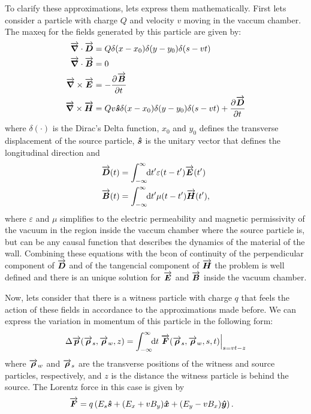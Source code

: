 \documentclass[
	12pt,				%
	openright,			%
	oneside,			%
	a4paper,		%
	chapter=TITLE,		%
	section=TITLE,		%
    brazil,				%
	english,			%
	sumario=tradicional,
	]{abntex2}
\begin{document}
  To clarify these approximations, lets express them mathematically. First lets consider a particle with charge $Q$ and velocity $v$  moving in the vaccum chamber. The \gls{maxeq} for the fields generated by this particle are given by:
  \begin{align}\label{eq:maxeq}
	  \nonumber
      \overrightarrow{\boldsymbol{\nabla}}\cdot\overrightarrow{\boldsymbol{D}} &= Q\delta(x-x_0)\delta(y-y_0)\delta(s-vt)\\ \nonumber
	  \overrightarrow{\boldsymbol{\nabla}}\cdot\overrightarrow{\boldsymbol{B}} &= 0\\
	  \overrightarrow{\boldsymbol{\nabla}}\times\overrightarrow{\boldsymbol{E}} &= -\frac{\partial^{{}}\overrightarrow{\boldsymbol{B}}}{\partial t^{{}}}\\
	  \nonumber
	  \overrightarrow{\boldsymbol{\nabla}}\times\overrightarrow{\boldsymbol{H}} &= Qv\boldsymbol{\hat s}\delta(x-x_0)\delta(y-y_0)\delta(s-vt) + \frac{\partial^{{}}\overrightarrow{\boldsymbol{D}}}{\partial t^{{}}}
  \end{align}
  where $\delta(\cdot)$ is the Dirac's Delta function, $x_0$ and $y_0$ defines the transverse displacement of the source particle, $\boldsymbol{\hat s}$ is the unitary vector that defines the longitudinal direction and
  \begin{align}
  	  \overrightarrow{\boldsymbol{D}}(t) &= \int_{-\infty}^{\infty}\!\!\text{d}t' \varepsilon(t-t')\overrightarrow{\boldsymbol{E}}(t')\\
	  \overrightarrow{\boldsymbol{B}}(t) &= \int_{-\infty}^{\infty}\!\!\text{d}t' \mu(t-t')\overrightarrow{\boldsymbol{H}}(t'),
  \end{align}
  where $\varepsilon$ and $\mu$ simplifies to the electric permeability and magnetic permissivity of the vacuum in the region inside the vaccum chamber where the source particle is, but can be any causal function that describes the dynamics of the material of the wall. Combining these equations with the \gls{bcon} of continuity of the perpendicular component of $\overrightarrow{\boldsymbol{D}}$ and of the tangencial component of $\overrightarrow{\boldsymbol{H}}$ the problem is well defined and there is an unique solution for $\overrightarrow{\boldsymbol{E}}$ and $\overrightarrow{\boldsymbol{B}}$ inside the vacuum chamber.

  Now, lets consider that there is a witness particle with charge $q$ that feels the action of these fields in accordance to the approximations made before. We can express the variation in momentum of this particle in the following form:
  \begin{align}\label{eq:momentum_gain}
  	  \Delta \overrightarrow{\boldsymbol{p}}(\overrightarrow{\boldsymbol{\rho}}_s, \overrightarrow{\boldsymbol{\rho}}_w, z) = \int_{-\infty}^{\infty}\!\!\text{d}t \left.\overrightarrow{\boldsymbol{F}}(\overrightarrow{\boldsymbol{\rho}}_s, \overrightarrow{\boldsymbol{\rho}}_w, s, t)\right|_{s=vt-z}
  \end{align}
  where $\overrightarrow{\boldsymbol{\rho}}_w$ and $\overrightarrow{\boldsymbol{\rho}}_s$ are the transverse positions of the witness and source particles, respectively, and $z$ is the distance the witness particle is behind the source. The Lorentz force in this case is given by
  \begin{align}\label{eq:lorentz_force}
  	  \overrightarrow{\boldsymbol{F}} &= q\left(E_s\boldsymbol{\hat s} + (E_x+vB_y)\boldsymbol{\hat x} + (E_y-vB_x)\boldsymbol{\hat y}\right).
  \end{align}
\end{document}
